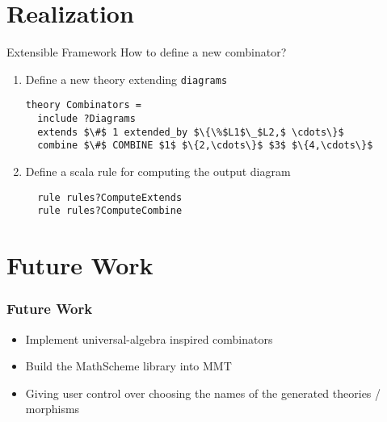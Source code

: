 \documentclass[t,12pt,numbers,fleqn,usenames,xcolor=dvipsnames]{beamer}
\begin{document}
\section{Realization}
\begin{frame}[fragile]{Extensible Framework}
How to define a new combinator? 
\vspace{0.25cm}
\begin{enumerate}
	\item Define a new theory extending \verb|diagrams|
\footnotesize{
\begin{lstlisting}
theory Combinators = 
  include ?Diagrams 
  extends $\#$ 1 extended_by $\{\%$L1$\_$L2,$ \cdots\}$
  combine $\#$ COMBINE $1$ $\{2,\cdots\}$ $3$ $\{4,\cdots\}$
\end{lstlisting}}	
\pause
	\item \normalsize{Define a scala rule for computing the output diagram}
\footnotesize
\begin{lstlisting}
  rule rules?ComputeExtends 
  rule rules?ComputeCombine   
\end{lstlisting}	
\end{enumerate}
\end{frame}

\section{Future Work}
\begin{frame}[fragile]
\frametitle{Future Work}
\begin{itemize}
	\item Implement universal-algebra inspired combinators 
	\item Build the MathScheme library into MMT 
	\item Giving user control over choosing the names of the generated theories / morphisms 
\end{itemize}
\end{frame}
\end{document}
